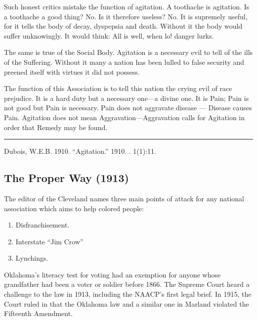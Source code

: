 \documentclass[letterpaper,10pt,english]{jupyterBook}
\begin{document}
\sphinxAtStartPar
Such honest critics mistake the function of agitation. A toothache is agitation. Is a toothache a good thing? No. Is it therefore useless? No. It is supremely useful, for it tells the body of decay, dyspepsia and death. Without it the body would suffer unknowingly. It would think: All is well, when lo! danger lurks.

\sphinxAtStartPar
The same is true of the Social Body. Agitation is a necessary evil to tell of the ills of the Suffering. Without it many a nation has been lulled to false security and preened itself with virtues it did not possess.

\sphinxAtStartPar
The function of this Association is to tell this nation the crying evil of race prejudice. It is a hard duty but a necessary one—a divine one. It is Pain; Pain is not good but Pain is necessary. Pain does not aggravate disease — Disease causes Pain. Agitation does not mean Aggravation—Aggravation calls for Agitation in order that Remedy may be found.


\bigskip\hrule\bigskip


\sphinxAtStartPar
{} Dubois, W.E.B. 1910. “Agitation.”  1910. . 1(1):11.


\subsection{The Proper Way (1913)}
\label{\detokenize{Volumes/05/05/proper_way:the-proper-way-1913}}\label{\detokenize{Volumes/05/05/proper_way::doc}}
\sphinxAtStartPar
The editor of the Cleveland  names three main points of attack for any national association which aims to help colored people:
\begin{enumerate}
%
\item {} 
\sphinxAtStartPar
Disfranchisement.

\item {} 
\sphinxAtStartPar
Interstate “Jim Crow”

\item {} 
\sphinxAtStartPar
Lynchings.

\end{enumerate}

\begin{sphinxShadowBox}
\sphinxstylesidebartitle{}

\sphinxAtStartPar
Oklahoma’s literacy test for voting had an exemption for anyone whose grandfather had been a voter or soldier before 1866. The Supreme Court heard a challenge to the law in 1913, including the NAACP’s first legal brief. In 1915, the Court ruled in  that the Oklahoma law and a similar one in Marland violated the Fifteenth Amendment.
\end{sphinxShadowBox}
\end{document}

